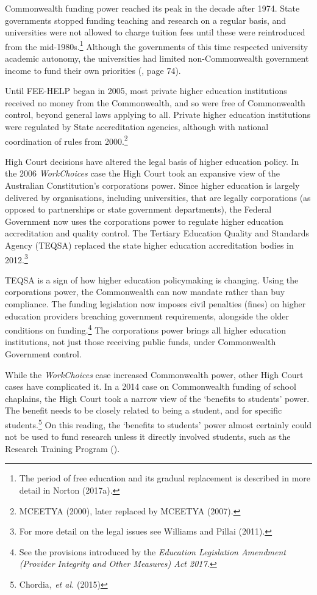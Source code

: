 \documentclass{grattan}
\begin{document}
Commonwealth funding power reached its peak in the decade after 1974. State governments stopped funding teaching and research on a regular basis, and universities were not allowed to charge tuition fees until these were reintroduced from the mid-1980s.\footnote{The period of free education and its gradual replacement is described in more detail in Norton (2017a).} Although the governments of this time respected university academic autonomy, the universities had limited non-Commonwealth government income to fund their own priorities (, page 74).

Until FEE-HELP began in 2005, most private higher education institutions received no money from the Commonwealth, and so were free of Commonwealth control, beyond general laws applying to all. Private higher education institutions were regulated by State accreditation agencies, although with national coordination of rules from 2000.\footnote{MCEETYA (2000), later replaced by MCEETYA (2007).}

High Court decisions have altered the legal basis of higher education policy. In the 2006 \emph{WorkChoices} case the High Court took an expansive view of the Australian Constitution's corporations power. Since higher education is largely delivered by organisations, including universities, that are legally corporations (as opposed to partnerships or state government departments), the Federal Government now uses the corporations power to regulate higher education accreditation and quality control. The Tertiary Education Quality and Standards Agency (TEQSA) replaced the state higher education accreditation bodies in 2012.\footnote{For more detail on the legal issues see Williams and Pillai (2011).}

TEQSA is a sign of how higher education policymaking is changing. Using the corporations power, the Commonwealth can now mandate rather than buy compliance. The funding legislation now imposes civil penalties (fines) on higher education providers breaching government requirements, alongside the older conditions on funding.\footnote{See the provisions introduced by the \emph{Education Legislation Amendment (Provider Integrity and Other Measures) Act 2017.}} The corporations power brings all higher education institutions, not just those receiving public funds, under Commonwealth Government control.

While the \emph{WorkChoices} case increased Commonwealth power, other High Court cases have complicated it. In a 2014 case on Commonwealth funding of school chaplains, the High Court took a narrow view of the `benefits to students' power. The benefit needs to be closely related to being a student, and for specific students.\footnote{Chordia\emph{, et al.} (2015)} On this reading, the `benefits to students' power almost certainly could not be used to fund research unless it directly involved students, such as the Research Training Program ().
\end{document}
